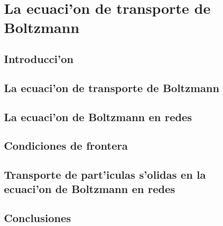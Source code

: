 \chapter{La ecuaci'on de transporte de Boltzmann}

\section{Introducci'on}

\section{La ecuaci'on de transporte de Boltzmann}
\section{La ecuaci'on de Boltzmann en redes}
\cite{he97}
\cite{ansumali00}
\cite{buick98}
\cite{buick98a}
\cite{guo00}
\cite{mason02} 
\cite{nourgaliev03}
\cite{alexander92}

\section{Condiciones de frontera}
\section{Transporte de part'iculas s'olidas en la ecuaci'on de Boltzmann en redes}
\cite{aidun98}
\cite{aidun03}
\cite{ding03b}
\cite{behrend95}
\cite{cosgrove04}
\cite{chopard02}
\cite{chopard00}
\cite{dupuis02}
\cite{desplat01}
\cite{feng04}
\cite{ladd01}
\cite{qi99}
\section{Conclusiones}
